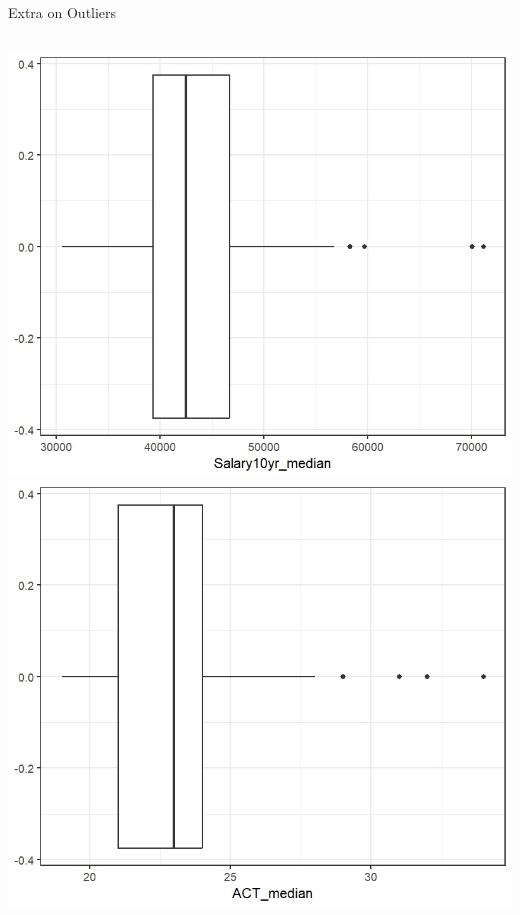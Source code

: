 \documentclass{beamer}
\begin{document}
\begin{frame}{Extra on Outliers}
\begin{columns}
\begin{column}{0.45\textwidth}
\begin{center}
    \includegraphics[scale=.25]{img/Salary_10yr_median_box.jpeg}
    \includegraphics[scale=.25]{img/ACT_median_box.jpeg}
\end{center}
 \end{column}
\end{columns}
\end{frame}
\end{document}
